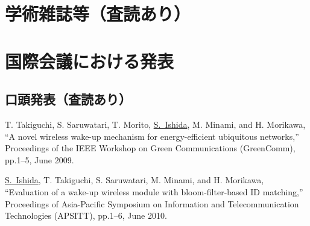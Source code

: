 \publications


\def\mej{\underline{石田繁巳}}
\def\me{\underline{S.~Ishida}}

\section*{学術雑誌等（査読あり）}


\section*{国際会議における発表}
\subsection*{口頭発表（査読あり）}
\begin{publication}{99}
T. Takiguchi, S. Saruwatari, T. Morito, \me, M. Minami, and H. Morikawa,
``A novel wireless wake-up mechanism for energy-efficient ubiquitous
  networks,''
Proceedings of the {IEEE} Workshop on Green Communications (GreenComm),
pp.1--5, June 2009.

\me, T. Takiguchi, S. Saruwatari, M. Minami, and H. Morikawa,
``Evaluation of a wake-up wireless module with bloom-filter-based {ID}
  matching,''
Proceedings of Asia-Pacific Symposium on Information and Telecommunication
  Technologies (APSITT),
pp.1--6, June 2010.

\end{publication}

